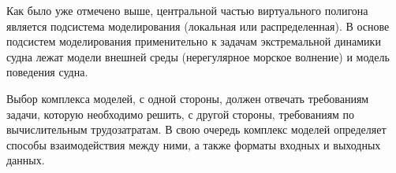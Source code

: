 %

Как было уже отмечено выше, центральной частью виртуального полигона является 
подсистема моделирования (локальная или распределенная). В основе подсистем моделирования 
применительно к задачам экстремальной динамики судна лежат модели внешней среды 
(нерегулярное морское волнение) и модель поведения судна. 

Выбор комплекса моделей, с одной стороны, должен отвечать требованиям задачи, которую необходимо решить, 
с другой стороны, требованиям по вычислительным трудозатратам. В свою очередь комплекс моделей определяет
способы взаимодействия между ними, а также форматы входных и выходных данных.
